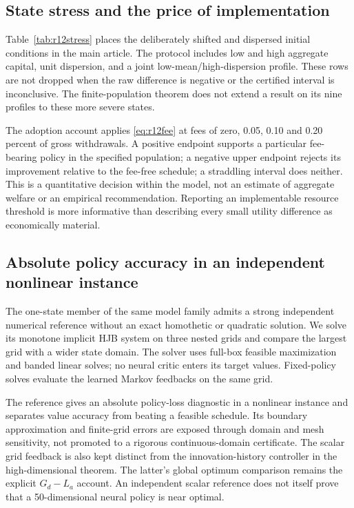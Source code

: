 \subsection{State stress and the price of implementation}
Table~\ref{tab:r12stress} places the deliberately shifted and dispersed initial conditions in the main article. The protocol includes low and high aggregate capital, unit dispersion, and a joint low-mean/high-dispersion profile. These rows are not dropped when the raw difference is negative or the certified interval is inconclusive. The finite-population theorem does not extend a result on its nine profiles to these more severe states.




The adoption account applies \eqref{eq:r12fee} at fees of zero, 0.05, 0.10 and 0.20 percent of gross withdrawals. A positive endpoint supports a particular fee-bearing policy in the specified population; a negative upper endpoint rejects its improvement relative to the fee-free schedule; a straddling interval does neither. This is a quantitative decision within the model, not an estimate of aggregate welfare or an empirical recommendation. Reporting an implementable resource threshold is more informative than describing every small utility difference as economically material.

\subsection{Absolute policy accuracy in an independent nonlinear instance}
The one-state member of the same model family admits a strong independent numerical reference without an exact homothetic or quadratic solution. We solve its monotone implicit HJB system on three nested grids and compare the largest grid with a wider state domain. The solver uses full-box feasible maximization and banded linear solves; no neural critic enters its target values. Fixed-policy solves evaluate the learned Markov feedbacks on the same grid.



The reference gives an absolute policy-loss diagnostic in a nonlinear instance and separates value accuracy from beating a feasible schedule. Its boundary approximation and finite-grid errors are exposed through domain and mesh sensitivity, not promoted to a rigorous continuous-domain certificate. The scalar grid feedback is also kept distinct from the innovation-history controller in the high-dimensional theorem. The latter's global optimum comparison remains the explicit $G_d-L_a$ account. An independent scalar reference does not itself prove that a 50-dimensional neural policy is near optimal.

